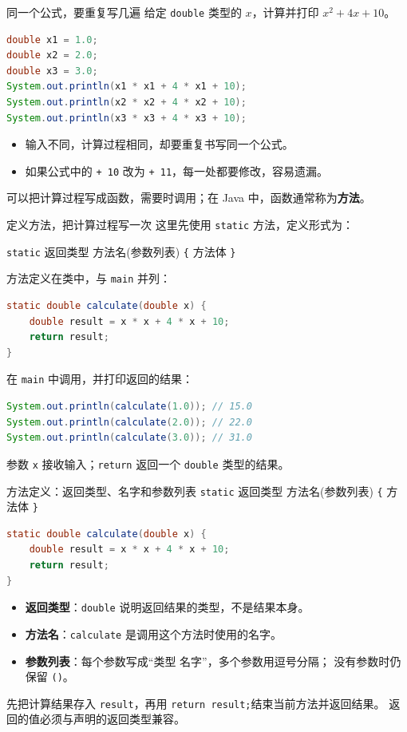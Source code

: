 \documentclass[aspectratio=169]{beamer}
\begin{document}
\begin{frame}[fragile]{同一个公式，要重复写几遍}
  给定 \texttt{double} 类型的 $x$，计算并打印 $x^2 + 4x + 10$。
  \begin{lstlisting}[language=Java]
double x1 = 1.0;
double x2 = 2.0;
double x3 = 3.0;
System.out.println(x1 * x1 + 4 * x1 + 10);
System.out.println(x2 * x2 + 4 * x2 + 10);
System.out.println(x3 * x3 + 4 * x3 + 10);
  \end{lstlisting}
  \begin{itemize}
    \item 输入不同，计算过程相同，却要重复书写同一个公式。
    \item 如果公式中的 \texttt{+ 10} 改为 \texttt{+ 11}，每一处都要修改，容易遗漏。
  \end{itemize}
  \medskip
  可以把计算过程写成\alert{函数}，需要时调用；在 Java 中，函数通常称为\textbf{方法}。
\end{frame}

\begin{frame}[fragile]{定义方法，把计算过程写一次}
  这里先使用 \texttt{static} 方法，定义形式为：
  \par
  \texttt{static} 返回类型 方法名(参数列表) \texttt{\{} 方法体 \texttt{\}}
  \par
  方法定义在类中，与 \texttt{main} 并列：
  \begin{lstlisting}[language=Java]
static double calculate(double x) {
    double result = x * x + 4 * x + 10;
    return result;
}
  \end{lstlisting}
  在 \texttt{main} 中调用，并打印返回的结果：
  \begin{lstlisting}[language=Java]
System.out.println(calculate(1.0)); // 15.0
System.out.println(calculate(2.0)); // 22.0
System.out.println(calculate(3.0)); // 31.0
  \end{lstlisting}
  参数 \texttt{x} 接收输入；\texttt{return} 返回一个 \texttt{double} 类型的结果。
\end{frame}

\begin{frame}[fragile]{方法定义：返回类型、名字和参数列表}
  \texttt{static} 返回类型 方法名(参数列表) \texttt{\{} 方法体 \texttt{\}}
  \begin{lstlisting}[language=Java]
static double calculate(double x) {
    double result = x * x + 4 * x + 10;
    return result;
}
  \end{lstlisting}
  \begin{itemize}
    \item \textbf{返回类型}：\texttt{double} 说明返回结果的类型，不是结果本身。
    \item \textbf{方法名}：\texttt{calculate} 是调用这个方法时使用的名字。
    \item \textbf{参数列表}：每个参数写成“类型 名字”，多个参数用逗号分隔；
      没有参数时仍保留 \texttt{()}。
  \end{itemize}
  \medskip
  先把计算结果存入 \texttt{result}，再用 \texttt{return result;}\alert{结束当前方法并返回结果}。
  返回的值必须与声明的返回类型兼容。
\end{frame}
\end{document}
